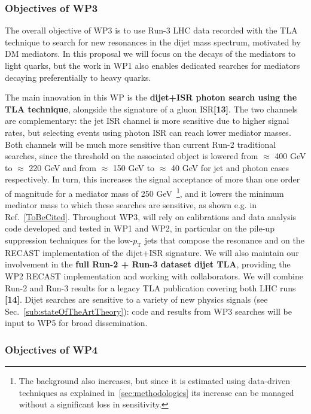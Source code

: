 \subsubsection{Objectives of WP3}

The overall objective of WP3 is to use Run-3 LHC data recorded with the TLA technique to search for new resonances in the dijet mass spectrum, motivated by DM mediators.
In this proposal we will focus on the decays of the mediators to light quarks, but the work in WP1 also enables dedicated searches for mediators decaying preferentially to heavy quarks. 

The main innovation in this WP is the \textbf{dijet+ISR photon search using the TLA technique}, alongside the signature of a gluon ISR\textbf{[13]}. 
The two channels are complementary: the jet ISR channel is more sensitive due to higher signal rates, but selecting events using photon ISR can reach lower mediator masses. 
Both channels will be much more sensitive than current Run-2 traditional searches, since the threshold on the associated object is lowered from $\approx$ 400 GeV to $\approx$ 220 GeV and from $\approx$ 150 GeV to $\approx$ 40 GeV for jet and photon cases respectively.  
In turn, this increases the signal acceptance of more than one order of magnitude for a mediator mass of 250 GeV~\footnote{The background also increases, but since it is estimated using data-driven techniques as explained in~\ref{sec:methodologies} its increase can be managed without a significant loss in sensitivity.}, 
and it lowers the minimum mediator mass to which these searches are sensitive, as shown e.g. in Ref.~\ref{ToBeCited}.%
Throughout WP3, will rely on calibrations and data analysis code developed and tested in WP1 and WP2, in particular on the pile-up suppression techniques for the low-$p_{\mathrm{T}}$ jets that compose the resonance and on the RECAST implementation of the dijet+ISR signature. 
We will also maintain our involvement in the \textbf{full Run-2 + Run-3 dataset dijet TLA}, providing the WP2 RECAST implementation and working with collaborators.  
We will combine Run-2 and Run-3 results for a legacy TLA publication covering both LHC runs \textbf{[14]}. 
Dijet searches are sensitive to a variety of new physics signals (see Sec.~\ref{sub:stateOfTheArtTheory}): code and results from WP3 searches will be input to WP5 for broad dissemination. 

\subsubsection{Objectives of WP4}

